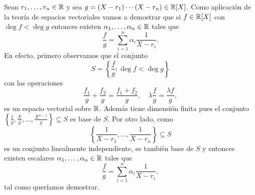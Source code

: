 \begin{block}
	Sean $r_1,\dots,r_n\in\mathbb{R}$ y sea 
	$g=(X-r_1)\cdots(X-r_n)\in\mathbb{R}[X]$. 
	Como aplicación de la teoría de espacios vectoriales vamos a demostrar que
	si $f\in\mathbb{R}[X]$ con $\deg f<\deg g$ entonces existen
	$\alpha_1,\dots,\alpha_n\in\mathbb{R}$ tales que 
	\[
		\frac{f}{g}=\sum_{i=1}^n\alpha_i\frac{1}{X-r_i}.
	\]
	En efecto, primero observamos que 
	el conjunto
	\[
	S=\left\{\frac{f}{g}:\deg f<\deg g\right\}
	\]
	con las operaciones 
	\[
		\frac{f_1}{g}+\frac{f_2}{g}=\frac{f_1+f_2}{g},\quad
		\lambda\frac{f}{g}=\frac{\lambda f}{g},
	\]
	es un espacio vectorial sobre $\mathbb{R}$. Además tiene dimensión finita pues el
	conjunto
	$
	\left\{\frac{1}{g},\frac{X}{g},\dots,\frac{X^{n-1}}{g}\right\}\subseteq S
	$
	es base de $S$.  Por otro lado, como 
	\[
	\left\{\frac{1}{X-r_1},\dots,\frac{1}{X-r_n}\right\}\subseteq S
	\]
	es un conjunto linealmente independiente, es también base de $S$ y entonces 
	existen escalares $\alpha_1,\dots,\alpha_n\in\mathbb{R}$ tales que
	\[
		\frac{f}{g}=\sum_{i=1}^n\alpha_i\frac{1}{X-r_i},
	\]
	tal como queríamos demostrar. 
\end{block}
%
%
%                                

